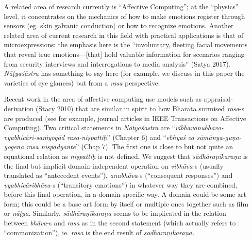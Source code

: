 A related area of research currently is “Affective Computing”; at the “physics” level, it concentrates on the mechanics of how to make emotions register through sensors (eg. skin galvanic conduction) or how to recognize emotions. Another related area of current research in this field with practical applications is that of microexpressions: the emphasis here is the “involuntary, fleeting facial movements that reveal true emotions—[that] hold valuable information for scenarios ranging from security interviews and interrogations to media analysis” (Satya 2017). \textsl{Nāṭyaśāstra} has something to say here (for example, we discuss in this paper the varieties of eye glances) but from a \textsl{rasa} perspective.

Recent work in the area of affective computing use models such as appraisal-derivation (Stacy 2010) that are similar in spirit to how Bharata surmised \textsl{rasa}-s are produced (see for example, journal articles in IEEE Transactions on Affective Computing). Two critical statements in \textsl{Nāṭyaśāstra} are “\textsl{vibhāvānubhāva-vyabhicāri-saṁyogād rasa-niṣpattiḥ}” (Chapter 6) and “\textsl{ebhyaś ca sāmānya-guṇa-yogena rasā niṣpadyante}” (Chap 7). The first one is close to but not quite an equational relation as \textsl{niṣpattiḥ} is not defined. We suggest that \textsl{sādhāraṇīkaraṇa} is the final but implicit domain-independent operation on \textsl{vibhāva}-s (usually translated as “antecedent events”), \textsl{anubhāva}-s (“consequent responses”) and \textsl{vyabhicāribhāva}-s (“transitory emotions”) in whatever way they are combined, before this final operation, in a domain-specific way. A domain could be some art form; this could be a base art form by itself or multiple ones together such as film or \textsl{nāṭya}. Similarly, \textsl{sādhāraṇīkaraṇa} seems to be implicated in the relation between \hbox{\textsl{bhāva}-s} and \textsl{rasa} as in the second statement (which actually refers to “commonization”), ie. \textsl{rasa} is the end result of \textsl{sādhāraṇīkaraṇa.}

